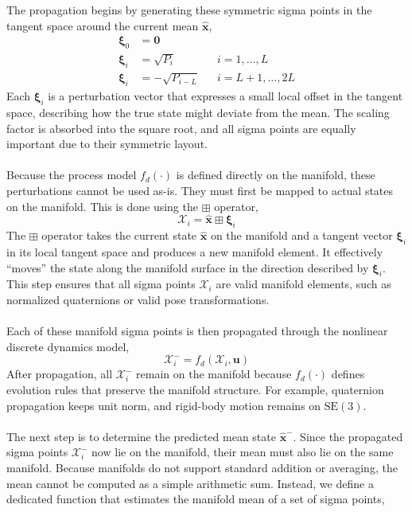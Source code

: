 The propagation begins by generating these symmetric sigma points in the tangent space around the current mean $\hat{\mathbf{x}}$,  
\begin{equation}
    \begin{aligned}
        \boldsymbol{\xi}_0 &= \mathbf{0} \\
        \boldsymbol{\xi}_i &= \sqrt{P_i}              && i = 1, \ldots, L \\
        \boldsymbol{\xi}_i &= -\sqrt{P_{i - L}}       && i = L+1, \ldots, 2L
    \end{aligned}
\end{equation}
Each $\boldsymbol{\xi}_i$ is a perturbation vector that expresses a small local offset in the tangent space, describing how the true state might deviate from the mean. The scaling factor is absorbed into the square root, and all sigma points are equally important due to their symmetric layout.  
\\ \\
Because the process model $f_d(\cdot)$ is defined directly on the manifold, these perturbations cannot be used as-is. They must first be mapped to actual states on the manifold. This is done using the $\boxplus$ operator,  
$$
    \mathcal{X}_i = \hat{\mathbf{x}} \boxplus \boldsymbol{\xi}_i
$$
The $\boxplus$ operator takes the current state $\hat{\mathbf{x}}$ on the manifold and a tangent vector $\boldsymbol{\xi}_i$ in its local tangent space and produces a new manifold element. It effectively “moves” the state along the manifold surface in the direction described by $\boldsymbol{\xi}_i$. This step ensures that all sigma points $\mathcal{X}_i$ are valid manifold elements, such as normalized quaternions or valid pose transformations.  
\\ \\
Each of these manifold sigma points is then propagated through the nonlinear discrete dynamics model,  
$$
    \mathcal{X}_i^- = f_d(\mathcal{X}_i, \mathbf{u})
$$
After propagation, all $\mathcal{X}_i^-$ remain on the manifold because $f_d(\cdot)$ defines evolution rules that preserve the manifold structure. For example, quaternion propagation keeps unit norm, and rigid-body motion remains on $\mathrm{SE}(3)$.  
\\ \\
The next step is to determine the predicted mean state $\hat{\mathbf{x}}^-$. Since the propagated sigma points $\mathcal{X}_i^-$ now lie on the manifold, their mean must also lie on the same manifold. Because manifolds do not support standard addition or averaging, the mean cannot be computed as a simple arithmetic sum. Instead, we define a dedicated function that estimates the manifold mean of a set of sigma points,  

